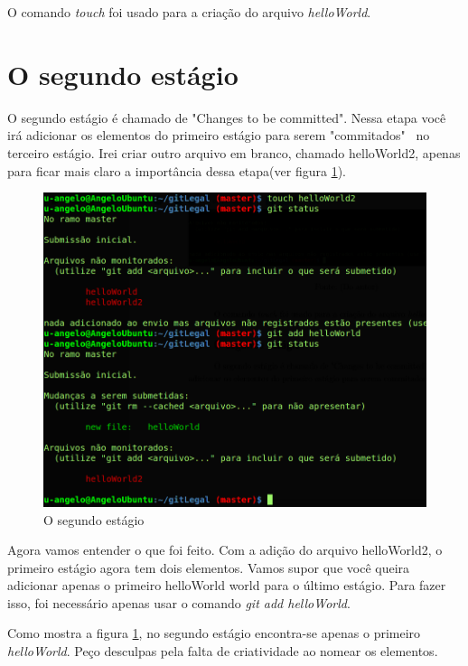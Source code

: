 \documentclass[12pt,openright,oneside,a4paper,english,brazil]{abntex2}
\begin{document}
O comando \textit{touch} foi usado para a criação do arquivo \textit{helloWorld}.

\section{O segundo estágio}

O segundo estágio é chamado de "Changes to be committed". Nessa etapa você irá adicionar os elementos do primeiro estágio para serem "commitados" \ no terceiro estágio. Irei criar outro arquivo em branco, chamado helloWorld2, apenas para ficar mais claro a importância dessa etapa(ver figura \ref{estagio2}).

\begin{figure}[h]
	\caption{\label{estagio2}O segundo estágio}
	\begin{center}
		\includegraphics[width=1\linewidth]{estagio2}
	\end{center}
\end{figure}

Agora vamos entender o que foi feito. Com a adição do arquivo helloWorld2, o primeiro estágio agora tem dois elementos. Vamos supor que você queira adicionar apenas o primeiro helloWorld world para o último estágio. Para fazer isso, foi necessário apenas usar o comando \textit{git add helloWorld}.

Como mostra a figura \ref{estagio2}, no segundo estágio encontra-se apenas o primeiro \textit{helloWorld}. Peço desculpas pela falta de criatividade ao nomear os elementos.
\end{document}
